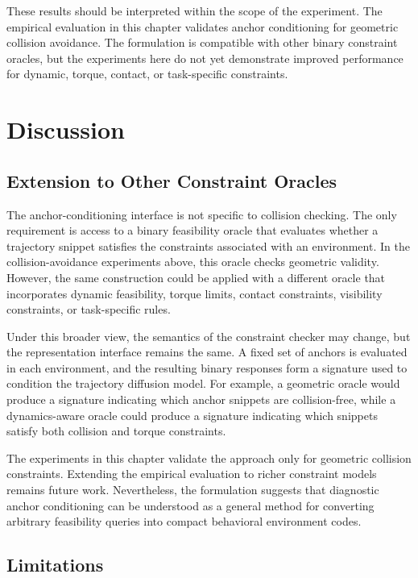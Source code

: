 These results should be interpreted within the scope of the experiment. The empirical evaluation in this chapter validates anchor conditioning for geometric collision avoidance. The formulation is compatible with other binary constraint oracles, but the experiments here do not yet demonstrate improved performance for dynamic, torque, contact, or task-specific constraints.

\section{Discussion}

\subsection{Extension to Other Constraint Oracles}

The anchor-conditioning interface is not specific to collision checking. The only requirement is access to a binary feasibility oracle that evaluates whether a trajectory snippet satisfies the constraints associated with an environment. In the collision-avoidance experiments above, this oracle checks geometric validity. However, the same construction could be applied with a different oracle that incorporates dynamic feasibility, torque limits, contact constraints, visibility constraints, or task-specific rules.

Under this broader view, the semantics of the constraint checker may change, but the representation interface remains the same. A fixed set of anchors is evaluated in each environment, and the resulting binary responses form a signature used to condition the trajectory diffusion model. For example, a geometric oracle would produce a signature indicating which anchor snippets are collision-free, while a dynamics-aware oracle could produce a signature indicating which snippets satisfy both collision and torque constraints.

The experiments in this chapter validate the approach only for geometric collision constraints. Extending the empirical evaluation to richer constraint models remains future work. Nevertheless, the formulation suggests that diagnostic anchor conditioning can be understood as a general method for converting arbitrary feasibility queries into compact behavioral environment codes.


\subsection{Limitations}

